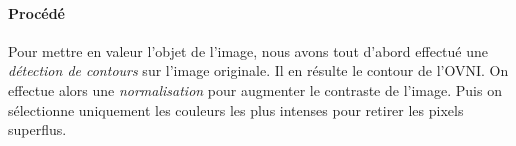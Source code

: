 	\paragraph{Procédé}	
		Pour mettre en valeur l'objet de l'image, nous avons tout d'abord effectué une \emph{détection de contours} sur l'image originale. Il en résulte le contour de l'OVNI. On effectue alors une \emph{normalisation} pour augmenter le contraste de l'image. Puis on sélectionne uniquement les couleurs les plus intenses pour retirer les pixels superflus.